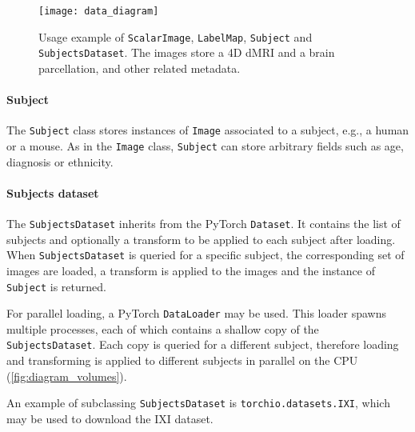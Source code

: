 \begin{figure}
  \centering
  \texttt{[image: data\_diagram]}
  \caption[Usage example of different data structures in TorchIO]{
    Usage example of \texttt{ScalarImage}, \texttt{LabelMap},
    \texttt{Subject} and \texttt{SubjectsDataset}.
    The images store a 4D \acf{dMRI} and a brain parcellation,
    and other related metadata.
  }
  \label{fig:data_structures}
\end{figure}


\paragraph{Subject}

The \texttt{Subject} class stores instances of \texttt{Image} associated to a subject, e.g., a human or a mouse.
As in the \texttt{Image} class, \texttt{Subject} can store arbitrary fields such as age, diagnosis or ethnicity.


\paragraph{Subjects dataset}

The \texttt{SubjectsDataset} inherits from the PyTorch \texttt{Dataset}.
It contains the list of subjects and optionally a transform to be applied to each subject after loading.
When \texttt{SubjectsDataset} is queried for a specific subject, the corresponding set of images are loaded, a transform is applied to the images and the instance of \texttt{Subject} is returned.

For parallel loading, a PyTorch \texttt{DataLoader} may be used.
This loader spawns multiple processes, each of which contains a shallow copy of the \texttt{SubjectsDataset}.
Each copy is queried for a different subject, therefore loading and transforming is applied to different subjects in parallel on the \ac{CPU} (\cref{fig:diagram_volumes}).

An example of subclassing \texttt{SubjectsDataset} is \texttt{torchio.datasets.IXI}, which may be used to download the \ac{IXI} dataset.


